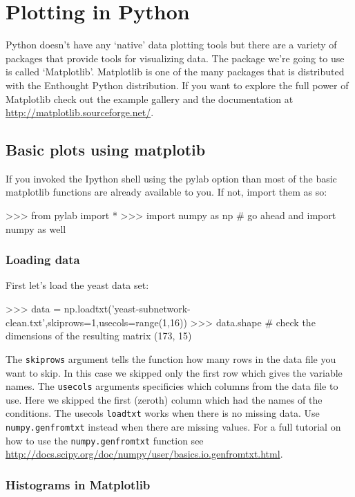 
\section{Plotting in Python}

Python doesn't have any `native' data plotting tools but there are a
variety of packages that provide tools for visualizing data. The package
we're going to use is called `Matplotlib'. Matplotlib is one of the many
packages that is distributed with the Enthought Python distribution. If
you want to explore the full power of Matplotlib check out the example
gallery and the documentation at
\url{http://matplotlib.sourceforge.net/}.

\subsection{Basic plots using matplotib}

If you invoked the Ipython shell using the pylab option than most of the
basic matplotlib functions are already available to you. If not, import
them as so:

\begin{python}
>>> from pylab import *
>>> import numpy as np # go ahead and import numpy as well
\end{python}
\subsubsection{Loading data}

First let's load the yeast data set:

\begin{python}
>>> data = np.loadtxt('yeast-subnetwork-clean.txt',skiprows=1,usecols=range(1,16))
>>> data.shape   # check the dimensions of the resulting matrix
(173, 15)
\end{python}
The \lstinline!skiprows! argument tells the function how many rows in
the data file you want to skip. In this case we skipped only the first
row which gives the variable names. The \lstinline!usecols! arguments
specificies which columns from the data file to use. Here we skipped the
first (zeroth) column which had the names of the conditions. The usecols
\lstinline!loadtxt! works when there is no missing data. Use
\lstinline!numpy.genfromtxt! instead when there are missing values. For
a full tutorial on how to use the \lstinline!numpy.genfromtxt! function
see
\url{http://docs.scipy.org/doc/numpy/user/basics.io.genfromtxt.html}.

\subsubsection{Histograms in Matplotlib}

